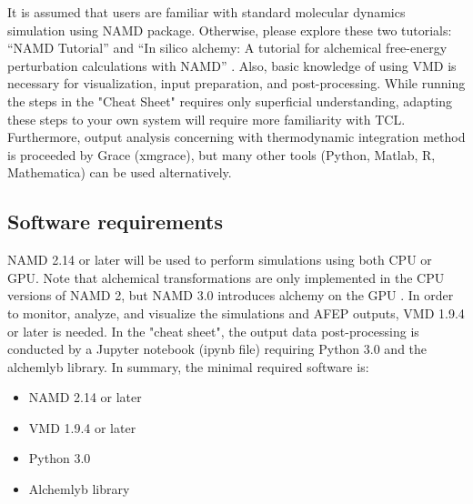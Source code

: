 \documentclass[9pt,tutorial]{livecoms}
\begin{document}
It is assumed that users are familiar with standard molecular dynamics simulation using NAMD package. Otherwise, please explore these two tutorials: “NAMD Tutorial” \cite{phillips2003} and “In silico alchemy: A tutorial for alchemical free-energy perturbation calculations with NAMD” \cite{Henin2017}. Also, basic knowledge of using VMD is necessary for visualization, input preparation, and post-processing. While running the steps in the "Cheat Sheet" requires only superficial understanding, adapting these steps to your own system will require more familiarity with TCL. 
Furthermore, output analysis concerning with thermodynamic integration method is proceeded by Grace (xmgrace), but many other tools (Python, Matlab, R, Mathematica) can be used alternatively. 
\subsection{Software requirements}\label{sec:7.2}

NAMD 2.14 or later \cite{Phillips2020} will be used to perform simulations using both CPU or GPU. Note that alchemical transformations are only implemented in the CPU versions of NAMD 2, but NAMD 3.0 introduces alchemy on the GPU \cite{Chen2020}.
In order to monitor, analyze, and visualize the simulations and AFEP outputs, VMD 1.9.4 or later \cite{Humphrey1996} is needed. In the "cheat sheet", the output data post-processing is conducted by a Jupyter notebook (ipynb file) requiring Python 3.0 and the alchemlyb library. 
In summary, the minimal required software is:
\begin{itemize}[left=0pt .. \parindent]
\item NAMD 2.14 or later\cite{Phillips2020}
\item VMD 1.9.4 or later \cite{Humphrey1996}
\item Python 3.0
\item Alchemlyb library \cite{shirts2008statistically, chodera2016simple}
\end{itemize}
\end{document}
